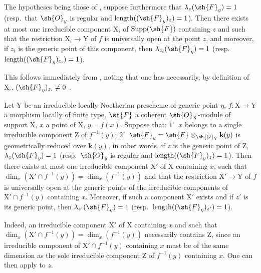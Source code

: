 \begin{corollary}[15.1.2]
\label{IV.15.1.2}
The hypotheses being those of , suppose furthermore that $\lambda_z(\sh{F}_y)=1$ (resp.~that $\sh{O}_y$ is regular and $\operatorname{length}((\sh{F}_y)_z)=1$).
Then there exists at most one irreducible component $\mathrm{X}_i$ of $\operatorname{Supp}(\sh{F})$ containing $z$ and such that the restriction $\mathrm{X}_i\to\mathrm{Y}$ of $f$ is universally open at the point $z$, and moreover, if $z_i$ is the generic point of this component, then $\lambda_{z_i}(\sh{F}_\eta)=1$ (resp.~$\operatorname{length}((\sh{F}_\eta)_{z_i})=1$).
\end{corollary}

This follows immediately from , noting that one has necessarily, by definition of $\mathrm{X}_i$, $(\sh{F}_\eta)_{z_i}\neq 0$ .

\begin{corollary}[15.1.3]
\label{IV.15.1.3}
Let $\mathrm{Y}$ be an irreducible locally Noetherian prescheme of generic point $\eta$, $f:\mathrm{X}\to\mathrm{Y}$ a morphism locally of finite type, $\sh{F}$ a coherent $\sh{O}_\mathrm{X}$-module of support $\mathrm{X}$, $x$ a point of $\mathrm{X}$, $y=f(x)$.
Suppose that: $1^\circ$~$x$ belongs to a single irreducible component $\mathrm{Z}$ of $f^{-1}(y)$; $2^\circ$~$\sh{F}_y=\sh{F}\otimes_{\sh{O}_\mathrm{Y}}\mathbf{k}(y)$ is geometrically reduced over $\mathbf{k}(y)$, in other words, if $z$ is the generic point of $\mathrm{Z}$, $\lambda_z(\sh{F}_y)=1$ (resp.~$\sh{O}_y$ is regular and $\operatorname{length}((\sh{F}_y)_z)=1$).
Then there exists at most one irreducible component $\mathrm{X}'$ of $\mathrm{X}$ containing $x$, such that $\dim_x(\mathrm{X}'\cap f^{-1}(y))=\dim_x(f^{-1}(y))$ and that the restriction $\mathrm{X}'\to\mathrm{Y}$ of $f$ is universally open at the generic points of the irreducible components of $\mathrm{X}'\cap f^{-1}(y)$ containing $x$.
Moreover, if such a component $\mathrm{X}'$ exists and if $z'$ is its generic point, then $\lambda_{z'}(\sh{F}_\eta)=1$ (resp.~$\operatorname{length}((\sh{F}_\eta)_{z'})=1$).
\end{corollary}

Indeed, an irreducible component $\mathrm{X}'$ of $\mathrm{X}$ containing $x$ and such that $\dim_x(\mathrm{X}'\cap f^{-1}(y))=\dim_x(f^{-1}(y))$ necessarily contains $\mathrm{Z}$, since an irreducible component of $\mathrm{X}'\cap f^{-1}(y)$ containing $x$ must be of the same dimension as the sole irreducible component $\mathrm{Z}$ of $f^{-1}(y)$ containing $x$.
One can then apply  to $z$.

